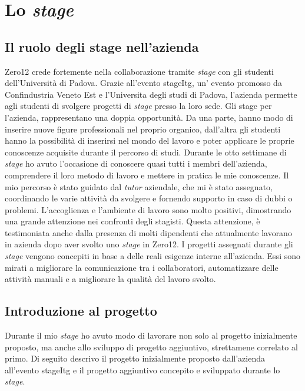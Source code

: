 
\chapter{Lo \textit{stage}}
\label{cap:lo-stage}



\section{Il ruolo degli stage nell'azienda}
Zero12 crede fortemente nella collaborazione tramite \textit{stage} con gli studenti dell'Università di Padova. Grazie all'evento \gls{stageItg}, un' evento promosso da Confindustria Veneto Est e l'Universita degli studi di Padova, l'azienda permette agli studenti di svolgere progetti di \textit{stage} presso la loro sede.
Gli stage per l'azienda, rappresentano una doppia opportunità. Da una parte, hanno modo di inserire nuove figure professionali nel proprio organico, dall’altra gli studenti hanno la possibilità di inserirsi nel mondo del lavoro e poter applicare le proprie conoscenze acquisite durante il percorso di studi.
Durante le otto settimane di \textit{stage} ho avuto l’occasione di conoscere quasi tutti i membri dell’azienda, comprendere il loro metodo di lavoro e mettere in pratica le mie conoscenze. Il mio percorso è stato guidato dal \textit{tutor} aziendale, che mi è stato assegnato, coordinando le varie attività da svolgere e fornendo supporto in caso di dubbi o problemi. 
L'accoglienza e l'ambiente di lavoro sono molto positivi, dimostrando una grande attenzione nei confronti degli stagisti. 
Questa attenzione, è testimoniata anche dalla presenza di molti dipendenti che attualmente lavorano in azienda dopo aver svolto uno \textit{stage} in Zero12.
I progetti assegnati durante gli \textit{stage} vengono concepiti in base a delle reali esigenze interne all’azienda. Essi sono mirati a migliorare la comunicazione tra i collaboratori, automatizzare delle attività manuali e a migliorare la qualità del lavoro svolto.

\section{Introduzione al progetto}
Durante il mio \textit{stage} ho avuto modo di lavorare non solo al progetto inizialmente proposto, ma anche allo sviluppo di progetto aggiuntivo, strettamene correlato al primo.
Di seguito descrivo il progetto inizialmente proposto dall'azienda all'evento \gls{stageItg} e il progetto aggiuntivo concepito e sviluppato durante lo \textit{stage}.
